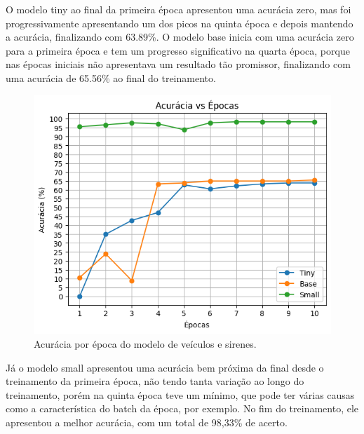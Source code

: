 \documentclass[conference]{IEEEtran}
\begin{document}
O modelo tiny ao final da primeira época apresentou uma acurácia zero, mas foi progressivamente apresentando um dos picos na quinta época e depois mantendo a acurácia, finalizando com 63.89\%. O modelo base inicia com uma acurácia zero para a primeira época e tem um progresso significativo na quarta época, porque nas épocas iniciais não apresentava um resultado tão promissor, finalizando com uma acurácia de 65.56\% ao final do treinamento.

\begin{figure}[htbp]
\centerline{\includegraphics[width=\linewidth]{figures/figure2.png}}
\caption{Acurácia por época do modelo de veículos e sirenes.}
\label{fig2}
\end{figure}

Já o modelo small apresentou uma acurácia bem próxima da final desde o treinamento da primeira época, não tendo tanta variação ao longo do treinamento, porém na quinta época teve um mínimo, que pode ter várias causas como a característica do batch da época, por exemplo. No fim do treinamento, ele apresentou a melhor acurácia, com um total de 98,33\% de acerto.
\end{document}
